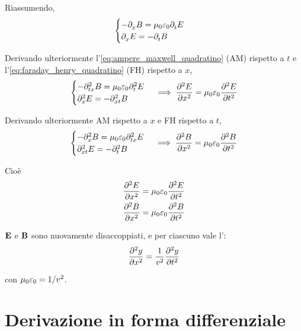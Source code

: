 Riassumendo,
\begin{equation}
    \begin{cases}
        - \parder[B]{x} = \mu_0 \eps_0 \parder[E]{t} \\
        \parder[E]{x} = - \parder[B]{t}
    \end{cases}
\end{equation}

Derivando ulteriormente l'\cref{eq:ampere_maxwell_quadratino} (AM) rispetto a $t$ e l'\cref{eq:faraday_henry_quadratino} (FH) rispetto a $x$,
\begin{equation}
    \begin{cases}
        - \partial^2_{tx} B = \mu_0 \eps_0 \parder[E][2]{t} \\
        \parder[E][2]{x} = - \partial^2_{xt} B
    \end{cases}
    \implies \parder[E][2]{x} = \mu_0 \eps_0 \parder[E][2]{t}
\end{equation}

Derivando ulteriormente AM rispetto a $x$ e FH rispetto a $t$,
\begin{equation}
    \begin{cases}
        - \parder[B][2]{x} = \mu_0 \eps_0 \partial^2_{tx} E \\
        \partial^2_{xt} E = - \parder[B][2]{t}
    \end{cases}
    \implies \parder[B][2]{x} = \mu_0 \eps_0 \parder[B][2]{t}
\end{equation}

Cioè
\begin{gather}
    \parder[E][2]{x} = \mu_0 \eps_0 \parder[E][2]{t} \\
    \parder[B][2]{x} = \mu_0 \eps_0 \parder[B][2]{t}
\end{gather}

$\mathbf{E}$ e $\mathbf{B}$ sono nuovamente disaccoppiati, e per ciascuno vale l':
\begin{equation}
\label{eq:dalembert_1d}
    \parder[y][2]{x} = \frac{1}{v^2} \parder[y][2]{t}
\end{equation}

con $\mu_0 \varepsilon_0 = 1/v^2$.

\section{Derivazione in forma differenziale}

